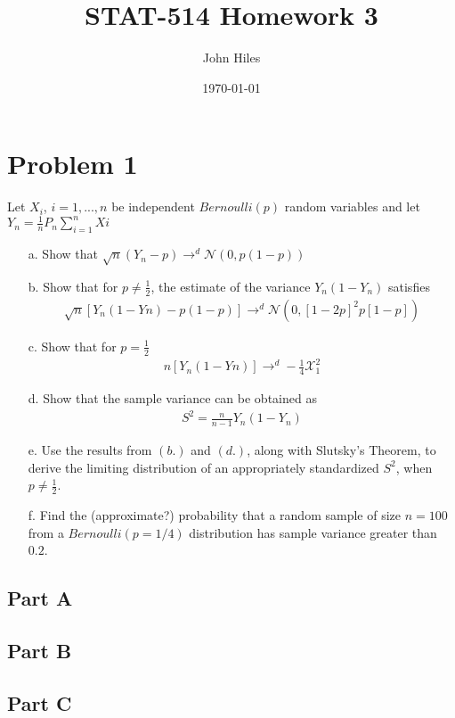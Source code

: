 \documentclass{article}
\title{STAT-514 Homework 3}
\author{John Hiles}
\date\today
\begin{document}
\maketitle %

\section*{Problem 1}
Let $X_i$, $i = 1,...,n$ be independent $Bernoulli(p)$ random variables and let $Y_n = \frac{1}{n} P_n \sum_{i=1}^{n} Xi$
\begin{enumerate}
\item[a.] Show that $\sqrt{n}(Y_n-p)\rightarrow^d\mathcal{N}(0,p(1 - p))$
\item[b.] Show that for $p \neq \frac{1}{2}$, the estimate of the variance $Y_n(1-Y_n)$ satisfies
\begin{align*}
\sqrt{n}[Y_n(1 - Yn) - p(1 - p)] \rightarrow^d \mathcal{N}(0,[1 - 2p]^2 p[1 - p])
\end{align*}
\item[c.] Show that for $p=\frac{1}{2}$
\begin{align*}
n[Y_n(1 - Yn)] \rightarrow^d -\frac{1}{4}\mathcal{X}^2_1
\end{align*}
\item[d.] Show that the sample variance can be obtained as
\begin{align*}
S^2 = \frac{n}{n-1} Y_n(1-Y_n)
\end{align*}
\item[e.] Use the results from $(b.)$ and $(d.)$, along with Slutsky’s Theorem, to derive the limiting distribution of an appropriately standardized $S^2$, when $p \neq \frac{1}{2}$.
\item[f.] Find the (approximate?) probability that a random sample of size $n = 100$ from a $Bernoulli(p = 1/4)$ distribution has sample variance greater than $0.2$.
\end{enumerate}
\subsection*{Part A}
\subsection*{Part B}
\subsection*{Part C}
\end{document}
